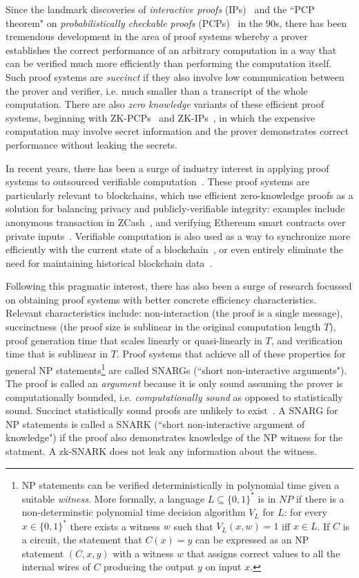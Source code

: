 
Since the landmark discoveries of \emph{interactive proofs} (IPs)~\cite{STOC:GolMicRac85} and the ``PCP theorem" on \emph{probabilistically checkable proofs} (PCPs)~\cite{STOC:BFLS91, FOCS:ALMSS92} in the 90s, there has been tremendous development in the area of proof systems whereby a prover establishes the correct performance of an arbitrary computation in a way that can be verified much more efficiently than performing the computation itself. Such proof systems are \emph{succinct} if they also involve low communication between the prover and verifier, i.e. much smaller than a transcript of the whole computation. There are also \emph{zero knowledge} variants of these efficient proof systems, beginning with ZK-PCPs~\cite{STOC:Kilian92} and ZK-IPs~\cite{C:BGGHKMR88}, in which the expensive computation may involve secret information and the prover demonstrates correct performance without leaking the secrets. 

In recent years, there has been a surge of industry interest in applying proof systems to outsourced verifiable computation~\cite{Sources}. These proof systems are particularly relevant to blockchains, which use efficient zero-knowledge proofs as a solution for balancing privacy and publicly-verifiable integrity: examples include anonymous transaction in ZCash~\cite{SP:BCGGMT14, Zcash}, and verifying Ethereum smart contracts over private inputs~\cite{}. Verifiable computation is also used as a way to synchronize more efficiently with the current state of a blockchain~\cite{Rollup}, or even entirely eliminate the need for maintaining historical blockchain data~\cite{Coda}. 

Following this pragmatic interest, there has also been a surge of research focussed on obtaining proof systems with better concrete efficiency characteristics. Relevant characteristics include: non-interaction (the proof is a single message), succinctness (the proof size is sublinear in the original computation length $T$), proof generation time that scales linearly or quasi-linearly in $T$, and verification time that is sublinear in $T$. Proof systems that achieve all of these properties for general NP statements\footnote{NP statements can be verified deterministically in polynomial time given a suitable \emph{witness}. More formally, a language $L \subseteq \{0,1\}^*$ is in $NP$ if there is a non-determinstic polynomial time decision algorithm $V_L$ for $L$: for every $x \in \{0,1\}^*$ there exists a witness $w$ such that $V_L(x, w) = 1$ iff $x \in L$. If $C$ is a circuit, the statement that $C(x) = y$ can be expressed as an NP statement $(C, x, y)$ with a witness $w$ that assigns correct values to all the internal wires of $C$ producing the output $y$ on input $x$.} are called SNARGs (``short non-interactive arguments"). 
The proof is called an \emph{argument} because it is only sound assuming the prover is computationally bounded, i.e. \emph{computationally sound} as opposed to statistically sound. Succinct statistically sound proofs are unlikely to exist~\cite{CC:GolVadWig02, ICALP:Wee05}. 
A SNARG for NP statements is called a SNARK (``short non-interactive argument of knowledge") if the proof also demonstrates knowledge of the NP witness for the statment. A zk-SNARK does not leak any information about the witness. 



